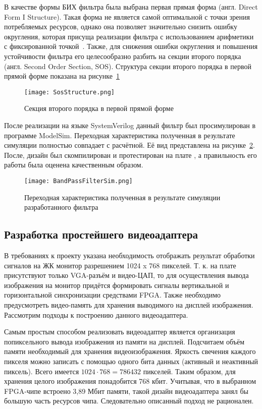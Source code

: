 В качестве формы БИХ фильтра была выбрана первая прямая форма (англ. \foreignlanguage{english}{Direct Form I Structure}). Такая форма не является самой оптимальной с точки зрения потребляемых ресурсов, однако она позволяет значительно снизить ошибку округления, которая присуща реализации фильтра с использованием арифметики с фиксированной точкой~\cite{Xilinx_IIR}. Также, для снижения ошибки округления и повышения устойчивости фильтра его целесообразно разбить на секции второго порядка (англ. \foreignlanguage{english}{Second Order Section, SOS}). Структура секции второго порядка в первой прямой форме показана на рисунке~\ref{fig:SosStructure}
\begin{figure}[ht]
	\centering
	\texttt{[image: SosStructure.png]}  
	\caption{Секция второго порядка в первой прямой форме}
	\label{fig:SosStructure}
\end{figure}

После реализации на языке SystemVerilog данный фильтр был просимулирован в программе ModelSim. Переходная характеристика полученная в результате симуляции полностью совпадает с расчётной. Её вид представлена на рисунке~\ref{fig:BandPassFilterSim}. После, дизайн был скомпилирован и протестирован на плате \boardname{}, а правильность его работы была оценена качественным образом. 
\begin{figure}[ht]
	\centering
	\texttt{[image: BandPassFilterSim.png]}  
	\caption{Переходная характеристика полученная в результате симуляции разработанного фильтра}
	\label{fig:BandPassFilterSim}
\end{figure}

\subsection{Разработка простейшего видеоадаптера}
\label{section:VideoAdapterBuilding}
В требованиях к проекту указана необходимость отображать результат обработки сигналов на ЖК монитор разрешением 1024 x 768 пикселей. Т. к. на плате \boardname{} присутствуют только VGA-разъём и видео-ЦАП, то для осуществления вывода изображения на монитор придётся формировать сигналы вертикальной и горизонтальной синхронизации средствами FPGA. Также необходимо предусмотреть видео-память для хранения выводимого на дисплей изображения. Рассмотрим подходы к построению данного видеоадаптера.

Самым простым способом реализовать видеоадаптер является организация попиксельного вывода изображения из памяти на дисплей. Подсчитаем объём памяти необходимый для хранения видеоизображения. Яркость свечения каждого пикселя можно записать с помощью одного бита данных (активный и неактивный пиксель). Всего имеется $1024 \cdot{} 768 = 786 432$ пикселей. Таким образом, для хранения целого изображения понадобится 768 кбит. Учитывая, что в выбранном FPGA-чипе встроено 3,89 Мбит памяти, такой дизайн видеоадаптера  занял бы большую часть ресурсов чипа. Следовательно описанный подход не рационален.

